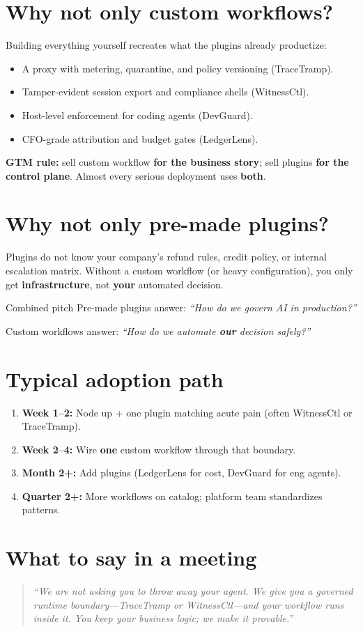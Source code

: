 \section{Why not only custom workflows?}

Building everything yourself recreates what the plugins already productize:

\begin{itemize}
  \item A proxy with metering, quarantine, and policy versioning (TraceTramp).
  \item Tamper-evident session export and compliance shells (WitnessCtl).
  \item Host-level enforcement for coding agents (DevGuard).
  \item CFO-grade attribution and budget gates (LedgerLens).
\end{itemize}

\textbf{GTM rule:} sell custom workflow \textbf{for the business story}; sell plugins \textbf{for the control plane}. Almost every serious deployment uses \textbf{both}.

\section{Why not only pre-made plugins?}

Plugins do not know your company's refund rules, credit policy, or internal escalation matrix. Without a custom workflow (or heavy configuration), you only get \textbf{infrastructure}, not \textbf{your} automated decision.

\begin{insightbox}{Combined pitch}
Pre-made plugins answer: \emph{``How do we govern AI in production?''}

Custom workflows answer: \emph{``How do we automate \textbf{our} decision safely?''}
\end{insightbox}

\section{Typical adoption path}

\begin{enumerate}
  \item \textbf{Week 1--2:} Node up + one plugin matching acute pain (often WitnessCtl or TraceTramp).
  \item \textbf{Week 2--4:} Wire \textbf{one} custom workflow through that boundary.
  \item \textbf{Month 2+:} Add plugins (LedgerLens for cost, DevGuard for eng agents).
  \item \textbf{Quarter 2+:} More workflows on catalog; platform team standardizes patterns.
\end{enumerate}

\section{What to say in a meeting}

\begin{quote}
\emph{``We are not asking you to throw away your agent. We give you a governed runtime boundary---TraceTramp or WitnessCtl---and your workflow runs inside it. You keep your business logic; we make it provable.''}
\end{quote}

